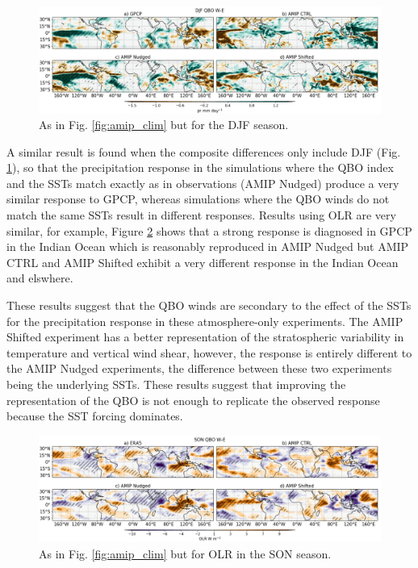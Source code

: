 \begin{figure}[t!]
\centering
 \includegraphics[width=\linewidth]{figures/pr_amip_djfqbowqboe.png}
\caption[DJF mean precipitation response in atmosphere-only experiments]{As in Fig. \ref{fig:amip_clim} but for the DJF season. }
\label{fig:amip_djf}
\end{figure}

A similar result is found when the composite differences only include DJF (Fig. \ref{fig:amip_djf}), so that the precipitation response in the simulations where the QBO index and the SSTs match exactly as in observations (AMIP Nudged) produce a very similar response to GPCP, whereas simulations where the QBO winds do not match the same SSTs result in different responses. 
Results using OLR are very similar, for example, Figure \ref{fig:amip_son_olr} shows that a strong response is diagnosed in GPCP in the Indian Ocean which is reasonably reproduced in AMIP Nudged but AMIP CTRL and AMIP Shifted exhibit a very different response in the Indian Ocean and elswhere.



These results suggest that the QBO winds are secondary to the effect of the SSTs for the precipitation response in these atmosphere-only experiments. The AMIP Shifted experiment has a better representation of the stratospheric variability in temperature and vertical wind shear, however, the response is entirely different to the AMIP Nudged experiments, the difference between these two experiments being the underlying SSTs. These results suggest that improving the representation of the QBO is not enough to replicate the observed response because the SST forcing dominates. 

\begin{figure}[t!]
\centering
 \includegraphics[width=\linewidth]{figures/olr_amip_sonqbowqboe.png}
\caption[SON OLR response in atmosphere-only experiments]{As in Fig. \ref{fig:amip_clim} but for OLR in the SON season. }
\label{fig:amip_son_olr}
\end{figure}

